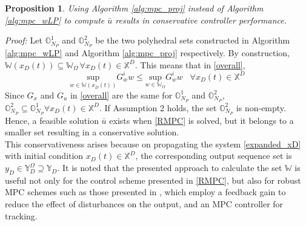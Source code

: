 \documentclass[letterpaper, 10 pt, conference]{ieeeconf}  %
\newtheorem{proposition}{Proposition}
\begin{document}
  \begin{proposition}
  	Using Algorithm \ref{alg:mpc_proj} instead of Algorithm \ref{alg:mpc_wLP} to compute $\bar{u}$ results in conservative controller performance.
  \end{proposition}
\hspace{4pt}
  \textit{Proof:}
  Let $\mathbb{O}_{N_P}^1$ and $\mathbb{O}_{N_P}^2$ be the two polyhedral sets constructed in Algorithm \ref{alg:mpc_wLP} and Algorithm \ref{alg:mpc_proj} respectively.
  By construction, $\mathbb{W}(x_D(t)) \subseteq \mathbb{W}_{\Omega} \hspace{2pt} \forall x_D(t) \in \mathbb{X}^D$. This means that in \eqref{overall}, 
  \begin{equation}
  \underset{w\in \mathbb{W}(x_D(t))}{\text{sup}} G_w^i w \leq  \underset{w\in \mathbb{W}_{\Omega}}{\text{sup}} G_w^i w \hspace{10pt} \forall x_D(t) \in \mathbb{X}^D
  \end{equation}
  Since $G_x$ and $G_u$ in \eqref{overall} are the same for $\mathbb{O}_{N_P}^1$ and $\mathbb{O}_{N_P}^2$, $\mathbb{O}_{N_P}^2 \subseteq \mathbb{O}_{N_P}^1 \forall x_D(t) \in \mathbb{X}^D$.
  If Assumption 2 holds, the set $\mathbb{O}_{N_P}^2$ is non-empty. Hence, a feasible solution $\bar{u}$ exists when \eqref{RMPC} is solved, but it belongs to a smaller set resulting in a conservative solution.\hfill\QED  \\
  This conservativeness arises because on propagating the system \eqref{expanded_xD} with initial condition $x_D(t) \in \mathbb{X}^D$, the corresponding output sequence set is $y_D \in \mathbb{Y}_D^{\Omega}  \supseteq  \mathbb{Y}_D$. 
  It is noted that the presented approach to calculate the set $\mathbb{W}$ is useful not only for the control scheme presented in \eqref{RMPC}, but also for robust MPC schemes such as those presented in \cite{MAYNE2005219}, which employ a feedback gain to reduce the effect of disturbances on the output, and an MPC controller for tracking.
  \iffalse
\end{document}
